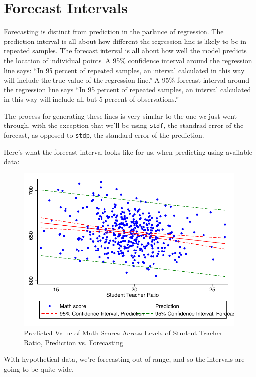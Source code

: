 \documentclass[12pt]{article}
\begin{document}
\section{Forecast Intervals}
\label{sec:forecast-intervals}

Forecasting is distinct from prediction in the parlance of
regression. The prediction interval is all about how different the
regression line is likely to be in repeated samples. The forecast
interval is all about how well the model predicts the location of
individual points. A 95\% confidence interval around the regression
line says: ``In 95 percent of repeated samples, an interval calculated
in this way will include the true value of the regression line.'' A
95\% forecast interval around the regression line says ``In 95 percent
of repeated samples, an interval calculated in this way will include
all but 5 percent of observations.'' 

The process for generating these lines is very similar to the one we
just went through, with the exception that we'll be using
\texttt{stdf}, the standrad error of the forecast, as opposed to
\texttt{stdp}, the standard error of the prediction. 

Here's what the forecast interval looks like for us, when predicting
using available data:


\begin{figure}
  \centering
  \caption{Predicted Value of Math Scores Across Levels
    of Student Teacher Ratio, Prediction vs. Forecasting}
\includegraphics{predictvforecast}
\end{figure}

With hypothetical data, we're forecasting out of range, and so the
intervals are going to be quite wide. 
\end{document}
